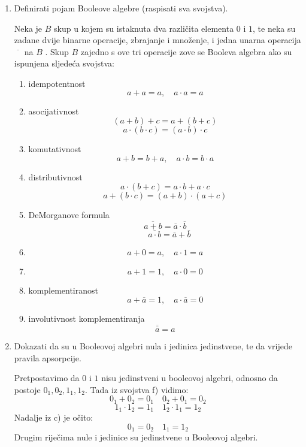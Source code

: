 \documentclass{article}
\begin{document}
\begin{enumerate}
\item Definirati pojam Booleove algebre (raspisati sva svojstva).

Neka je $B$ skup u kojem su istaknuta dva različita elementa $0$ i $1$, te neka su zadane dvije binarne operacije, zbrajanje i množenje, i jedna unarna operacija $\overline{\phantom{m}}$ na $B$ . Skup $B$ zajedno s ove tri operacije zove se Booleva algebra ako su ispunjena sljedeća svojstva:

\begin{enumerate}

\item idempotentnost
$$a + a = a,\quad a\cdot a = a$$

\item asocijativnost
$$(a + b) + c = a + (b + c)$$
$$a\cdot(b\cdot c) = (a\cdot b)\cdot c$$

\item komutativnost
$$a + b = b + a,\quad a\cdot b = b\cdot a$$

\item distributivnost 
$$a\cdot(b + c) = a\cdot b + a\cdot c$$
$$a + (b\cdot c) = (a + b)\cdot (a + c)$$

\item DeMorganove formula 
$$\overline{a+b} = \overline{a}\cdot\overline{b}$$
$$\quad\overline{a\cdot b} = \overline{a}+\overline{b}$$

\item $$a + 0 = a,\quad a\cdot1 = a$$

\item $$a + 1 = 1, \quad a\cdot 0 = 0$$

\item komplementiranost 
$$a + \overline{a} = 1,\quad a\cdot\overline{a} = 0$$

\item involutivnost komplementiranja
$$\overline{\overline{a}} = a$$

\end{enumerate}

\item Dokazati da su u Booleovoj algebri nula i jedinica jedinstvene, te da vrijede pravila apsorpcije.

Pretpostavimo da $0$ i $1$ nisu jedinstveni u booleovoj algebri, odnosno da postoje $0_1, 0_2, 1_1, 1_2$. Tada iz svojstva f) vidimo:
$$0_1 + 0_2 = 0_1\quad 0_2 + 0_1 = 0_2$$
$$1_1\cdot1_2 = 1_1\quad 1_2\cdot1_1 = 1_2$$
Nadalje iz c) je očito:
$$0_1 = 0_2\quad 1_1 = 1_2$$
Drugim riječima nule i jedinice su jedinstvene u Booleovoj algebri.


\end{enumerate}
\end{document}
